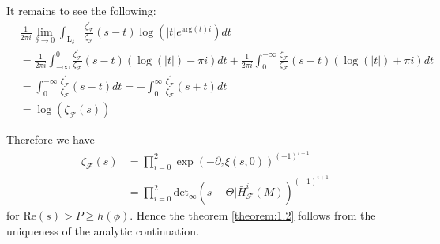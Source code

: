 It remains to see the following:
\begin{equation*}
    \begin{split}
        &\frac{1}{2\pi{i}}
        \lim_{\delta\rightarrow{0}}\int_{\mathrm{L}_{\delta-}}\frac{\zeta^{'}_{\mathcal{F}}}{\zeta_{\mathcal{F}}}(s-t)\log(|t|e^{\mathrm{arg}(t)i})dt\\
        &=\frac{1}{2\pi{i}}
        \int_{-\infty}^{0}\frac{\zeta^{'}_{\mathcal{F}}}{\zeta_{\mathcal{F}}}(s-t)
        ( \log(|t|) - \pi{i} )dt 
        +\frac{1}{2\pi{i}}
        \int_{0}^{-\infty}\frac{\zeta^{'}_{\mathcal{F}}}{\zeta_{\mathcal{F}}}(s-t)
        ( \log(|t|) + \pi{i} )dt\\
        &=\int_{0}^{-\infty}\frac{\zeta^{'}_{\mathcal{F}}}{\zeta_{\mathcal{F}}}(s-t)dt = -\int_{0}^{\infty}\frac{\zeta^{'}_{\mathcal{F}}}{\zeta_{\mathcal{F}}}(s+t)dt \\
        &=\log(\zeta_{\mathcal{F}}(s))
    \end{split}
\end{equation*}

Therefore we have
\begin{equation*}
    \begin{split}
        \zeta_{\mathcal{F}}(s) &= \prod_{i=0}^{2}\exp(-\partial_{z}\xi(s,0))^{(-1)^{i+1}} \\
        &= \prod_{i=0}^{2} \mathrm{det}_{\infty}(s-\Theta | \bar{H}^{i}_{\mathcal{F}}(M))^{(-1)^{i+1}}
    \end{split}
\end{equation*}
for $\mathrm{Re}(s)>P\ge{h(\phi)}$.
Hence the theorem \ref{theorem:1.2} follows from the uniqueness of  the analytic continuation.
